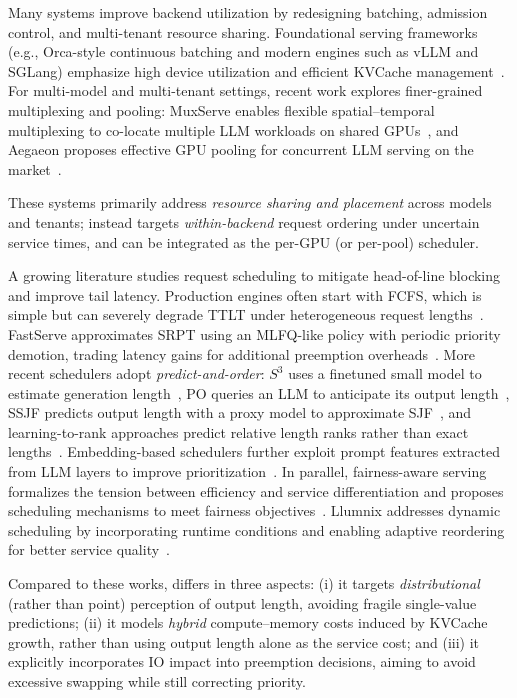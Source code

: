 Many systems improve backend utilization by redesigning batching, admission control, and multi-tenant resource sharing. Foundational serving frameworks (e.g., Orca-style continuous batching and modern engines such as vLLM and SGLang) emphasize high device utilization and efficient KVCache management~\cite{yu2022orca,kwon2023efficient,zheng2024sglang}. For multi-model and multi-tenant settings, recent work explores finer-grained multiplexing and pooling: MuxServe enables flexible spatial--temporal multiplexing to co-locate multiple LLM workloads on shared GPUs~\cite{duan2024muxserve}, and Aegaeon proposes effective GPU pooling for concurrent LLM serving on the market~\cite{xiang2025aegaeon}. 

These systems primarily address \emph{resource sharing and placement} across models and tenants; \oursched instead targets \emph{within-backend} request ordering under uncertain service times, and can be integrated as the per-GPU (or per-pool) scheduler.

A growing literature studies request scheduling to mitigate head-of-line blocking and improve tail latency. Production engines often start with FCFS, which is simple but can severely degrade TTLT under heterogeneous request lengths~\cite{kwon2023efficient,zheng2024sglang}. FastServe approximates SRPT using an MLFQ-like policy with periodic priority demotion, trading latency gains for additional preemption overheads~\cite{wu2023fast}. More recent schedulers adopt \emph{predict-and-order}: $S^3$ uses a finetuned small model to estimate generation length~\cite{jin2023s}, PO queries an LLM to anticipate its output length~\cite{po}, SSJF predicts output length with a proxy model to approximate SJF~\cite{qiu2024efficient}, and learning-to-rank approaches predict relative length ranks rather than exact lengths~\cite{fu2024efficient}. Embedding-based schedulers further exploit prompt features extracted from LLM layers to improve prioritization~\cite{shahout2024don}. 
In parallel, fairness-aware serving formalizes the tension between efficiency and service differentiation and proposes scheduling mechanisms to meet fairness objectives~\cite{sheng2024fairness}. Llumnix addresses dynamic scheduling by incorporating runtime conditions and enabling adaptive reordering for better service quality~\cite{sun2024llumnix}. 

Compared to these works, \oursched differs in three aspects: (i) it targets \emph{distributional} (rather than point) perception of output length, avoiding fragile single-value predictions; (ii) it models \emph{hybrid} compute--memory costs induced by KVCache growth, rather than using output length alone as the service cost; and (iii) it explicitly incorporates IO impact into preemption decisions, aiming to avoid excessive swapping while still correcting priority.

